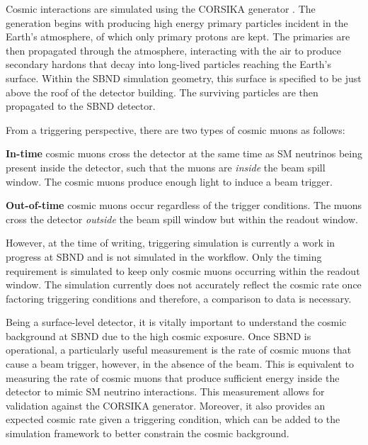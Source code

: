 Cosmic interactions are simulated using the CORSIKA generator \cite{corsika}.
The generation begins with producing high energy primary particles incident in the Earth's atmosphere, of which only primary protons are kept. 
The primaries are then propagated through the atmosphere, interacting with the air to produce secondary hardons that decay into long-lived particles reaching the Earth's surface.
Within the SBND simulation geometry, this surface is specified to be just above the roof of the detector building.
The surviving particles are then propagated to the SBND detector.

From a triggering perspective, there are two types of cosmic muons as follows:
\begin{coloritemize}
        \item\textbf{In-time} cosmic muons cross the detector at the same time as SM neutrinos being present inside the detector, such that the muons are \textit{inside} the beam spill window. The cosmic muons produce enough light to induce a beam trigger.                            
        \item\textbf{Out-of-time} cosmic muons occur regardless of the trigger conditions. The muons cross the detector \textit{outside} the beam spill window but within the readout window.  
\end{coloritemize}
However, at the time of writing, triggering simulation is currently a work in progress at SBND and is not simulated in the workflow. 
Only the timing requirement is simulated to keep only cosmic muons occurring within the readout window.
The simulation currently does not accurately reflect the cosmic rate once factoring triggering conditions and therefore, a comparison to data is necessary. 

Being a surface-level detector, it is vitally important to understand the cosmic background at SBND due to the high cosmic exposure.
Once SBND is operational, a particularly useful measurement is the rate of cosmic muons that cause a beam trigger, however, in the absence of the beam.
This is equivalent to measuring the rate of cosmic muons that produce sufficient energy inside the detector to mimic SM neutrino interactions.
This measurement allows for validation against the CORSIKA generator.
Moreover, it also provides an expected cosmic rate given a triggering condition, which can be added to the simulation framework to better constrain the cosmic background.                

